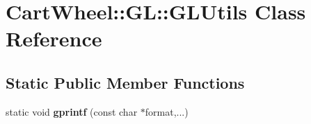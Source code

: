 \hypertarget{classCartWheel_1_1GL_1_1GLUtils}{
\section{CartWheel::GL::GLUtils Class Reference}
\label{classCartWheel_1_1GL_1_1GLUtils}
}
\subsection*{Static Public Member Functions}
\begin{DoxyCompactItemize}
\item 
\hypertarget{classCartWheel_1_1GL_1_1GLUtils_ae35577078e7b87c792e721a260841931}{
static void {\bfseries gprintf} (const char $\ast$format,...)}
\label{classCartWheel_1_1GL_1_1GLUtils_ae35577078e7b87c792e721a260841931}


\end{DoxyCompactItemize}
